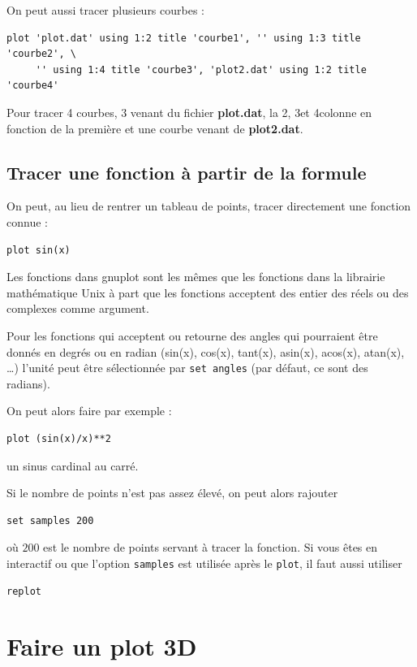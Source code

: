 \documentclass[a4paper,twoside]{article}
\begin{document}
\bigskip

On peut aussi tracer plusieurs courbes :
\begin{verbatim}
plot 'plot.dat' using 1:2 title 'courbe1', '' using 1:3 title 'courbe2', \
     '' using 1:4 title 'courbe3', 'plot2.dat' using 1:2 title 'courbe4'
\end{verbatim}
Pour tracer 4 courbes, 3 venant du fichier \textbf{plot.dat}, la 2\ieme, 3\ieme et 4\ieme colonne en fonction de la première et une courbe venant de \textbf{plot2.dat}.


\subsection{Tracer une fonction à partir de la formule}
On peut, au lieu de rentrer un tableau de points, tracer directement une fonction connue : 
\begin{verbatim}
plot sin(x)
\end{verbatim}

Les fonctions dans gnuplot sont les mêmes que les fonctions dans la librairie mathématique Unix à part que les fonctions acceptent des entier des réels ou des complexes comme argument. 

\begin{remarque}
Pour les fonctions qui acceptent ou retourne des angles qui pourraient être donnés en degrés ou en radian (sin(x), cos(x), tant(x), asin(x), acos(x), atan(x), \dots) l'unité peut être sélectionnée par \texttt{set angles} (par défaut, ce sont des radians).
\end{remarque}

On peut alors faire par exemple : 
\begin{verbatim}
plot (sin(x)/x)**2
\end{verbatim}
un sinus cardinal au carré.

Si le nombre de points n'est pas assez élevé, on peut alors rajouter
\begin{verbatim}
set samples 200
\end{verbatim}
où $200$ est le nombre de points servant à tracer la fonction. Si vous êtes en interactif ou que l'option \texttt{samples} est utilisée après le \texttt{plot}, il faut aussi utiliser
\begin{verbatim}
replot
\end{verbatim}

\section{Faire un plot 3D}
\end{document}
